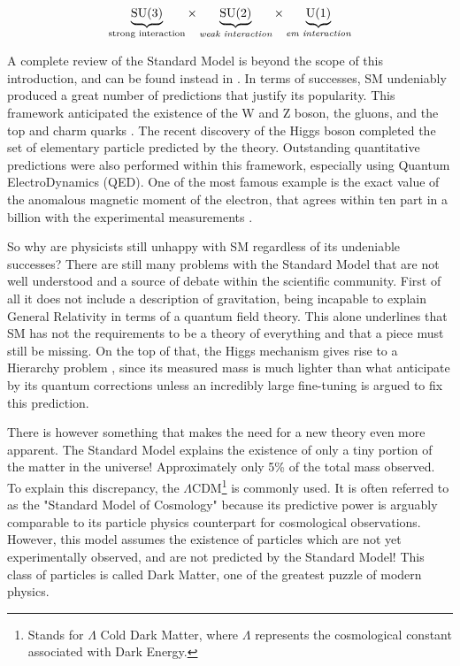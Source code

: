 \begin{equation}
    \label{eq:sm-group}
    \underbrace{\rm{SU(3)}}_{\textrm{strong interaction}} \times \underbrace{\rm{SU(2)}}_{\textit{weak interaction}} \times \underbrace{\rm{U(1)}}_{\textit{em interaction}}
\end{equation}

A complete review of the Standard Model is beyond the scope of this introduction, and can be found instead in \cite{review-particle-physics}. In terms of successes, SM undeniably produced a great number of predictions that justify its popularity. This framework anticipated the existence of the W and Z boson, the gluons, and the top and charm quarks \cite{Woithe_2017}. The recent discovery of the Higgs boson \cite{Aad:2012tfa} completed the set of elementary particle predicted by the theory. Outstanding quantitative predictions were also performed within this framework, especially using Quantum ElectroDynamics (QED).  One of the most famous example is the exact value of the anomalous magnetic moment of the electron, that agrees within ten part in a billion with the experimental measurements \cite{Mohr:2015ccw}.

So why are physicists still unhappy with SM regardless of its undeniable successes? There are still many problems with the Standard Model that are not well understood and a source of debate within the scientific community. First of all it does not include a description of gravitation, being incapable to explain General Relativity in terms of a quantum field theory. This alone underlines that SM has not the requirements to be a theory of everything and that a piece must still be missing. On the top of that, the Higgs mechanism gives rise to a Hierarchy problem \cite{review-particle-physics}, since its measured mass is much lighter than what anticipate by its quantum corrections unless an incredibly large fine-tuning is argued to fix this prediction.

There is however something that makes the need for a new theory even more apparent. The Standard Model explains the existence of only a tiny portion of the matter in the universe! Approximately only 5\% of the total mass observed. To explain this discrepancy, the $\Lambda$CDM\footnote{Stands for $\Lambda$ Cold Dark Matter, where $\Lambda$ represents the cosmological constant associated with Dark Energy.} is commonly used.  It is often referred to as the "Standard Model of Cosmology" because its predictive power is arguably comparable to its particle physics counterpart for cosmological observations. However, this model assumes the existence of particles which are not yet experimentally observed, and are not predicted by the Standard Model! This class of particles is called Dark Matter, one of the greatest puzzle of modern physics.

